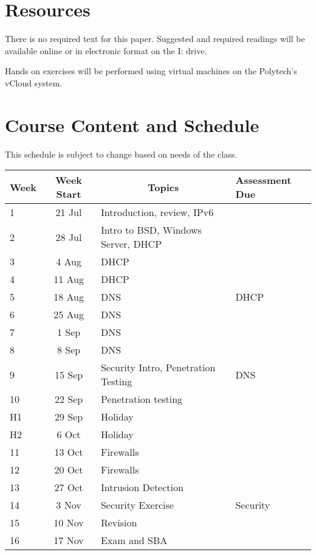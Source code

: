 \documentclass{article}
\begin{document}
\section*{Resources}
There is no required text for this paper.  Suggested and required readings will be available online or in electronic format on the I: drive.

Hands on exercises will be performed using virtual machines on the Polytech's vCloud system.

\newpage 

\section*{Course Content and Schedule}
This schedule is subject to change based on needs of the class.

\renewcommand{\arraystretch}{1.5}
\begin{tabular}{|l|c|l|l|}
\hline
 Week & Week Start & \multicolumn{1}{c|}{Topics}               & Assessment Due   \\ \hline
 1    & 21 Jul     & Introduction, review, IPv6                &   \\ \hline
 2    & 28 Jul     & Intro to BSD, Windows Server, DHCP        &   \\ \hline
 3    &  4 Aug     & DHCP                                      &   \\ \hline
 4    & 11 Aug     & DHCP                                      &   \\ \hline
 5    & 18 Aug     & DNS                                       & DHCP  \\ \hline
 6    & 25 Aug     & DNS                                       &   \\ \hline
 7    &  1 Sep     & DNS                                       &   \\ \hline
 8    &  8 Sep     & DNS                                       &   \\ \hline
 9    & 15 Sep     & Security Intro, Penetration Testing       & DNS  \\ \hline
 10   & 22 Sep     & Penetration testing                       &   \\ \hline
 H1   & 29 Sep     & Holiday                                   &   \\ \hline
 H2   &  6 Oct     & Holiday                                   &   \\ \hline
 11   & 13 Oct     & Firewalls                                 &   \\ \hline
 12   & 20 Oct     & Firewalls                                 &   \\ \hline
 13   & 27 Oct     & Intrusion Detection                       &   \\ \hline
 14   &  3 Nov     & Security Exercise                         & Security  \\ \hline
 15   & 10 Nov     & Revision                                  &   \\ \hline
 16   & 17 Nov     & Exam and SBA                              &   \\ \hline
\end{tabular}
\end{document}
